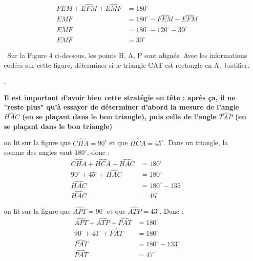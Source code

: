 \documentclass[answers]{exam}
\begin{document}
\begin{questions}
\begin{parts}
\begin{solution}
  \begin{align}
    \widehat{FEM} + \widehat{EFM} + \widehat{EMF} &= 180^\circ \\
    \widehat{EMF} &= 180^\circ - \widehat{FEM} - \widehat{EFM} \\
    \widehat{EMF} &= 180^\circ - 120^\circ - 30^\circ  \\
    \widehat{EMF} &= 30^\circ
  \end{align}

\end{solution}


    \end{parts}


  \question[2.5] \justifier\ Sur la Figure 4 ci-dessous, les points H, A, P sont alignés. Avec les informations codées sur cette figure, déterminer si le triangle CAT est
rectangle en A. Justifier.


\begin{solution}
.

\medskip

\textbf{Il est important d'avoir bien cette stratégie en tête : après ça, il ne "reste plus" qu'à essayer de déterminer d'abord la mesure de l'angle $\widehat{HAC}$ (en se plaçant dans le bon triangle), puis celle de l'angle $\widehat{TAP}$ (en se plaçant dans le bon triangle)}

\medskip

 on lit sur la figure que $\widehat{CHA}=90^\circ$ et que $\widehat{HCA}=45^\circ$.  
Dans un triangle, la somme des angles vaut $180^\circ$, donc :
\begin{align*}
\widehat{CHA} + \widehat{HCA} + \widehat{HAC} &= 180^\circ \\
90^\circ + 45^\circ + \widehat{HAC} &= 180^\circ \\
\widehat{HAC} &= 180^\circ - 135^\circ \\
\widehat{HAC} &= 45^\circ
\end{align*}

\medskip

 on lit sur la figure que $\widehat{APT}=90^\circ$ et que $\widehat{ATP}=43^\circ$.  
Donc :
\begin{align*}
\widehat{APT} + \widehat{ATP} + \widehat{PAT} &= 180^\circ \\
90^\circ + 43^\circ + \widehat{PAT} &= 180^\circ \\
\widehat{PAT} &= 180^\circ - 133^\circ \\
\widehat{PAT} &= 47^\circ
\end{align*}


\end{solution}
\end{questions}
\end{document}

